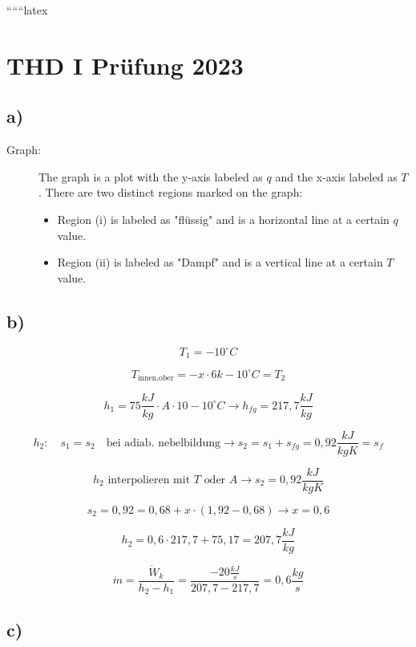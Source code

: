 
``````latex


\section*{THD I Prüfung 2023}

\subsection*{a)}

\begin{description}
    \item[Graph:] The graph is a plot with the y-axis labeled as $q$ and the x-axis labeled as $T$. There are two distinct regions marked on the graph:
    \begin{itemize}
        \item Region (i) is labeled as "flüssig" and is a horizontal line at a certain $q$ value.
        \item Region (ii) is labeled as "Dampf" and is a vertical line at a certain $T$ value.
    \end{itemize}
\end{description}

\subsection*{b)}

\[
T_1 = -10^\circ C
\]

\[
T_{\text{innen,ober}} = -x \cdot 6k - 10^\circ C = T_2
\]

\[
h_1 = 75 \frac{kJ}{kg} \cdot A \cdot 10 - 10^\circ C \rightarrow h_{fg} = 217,7 \frac{kJ}{kg}
\]

\[
h_2: \quad s_1 = s_2 \quad \text{bei adiab. nebelbildung} \rightarrow s_2 = s_1 + s_{fg} = 0,92 \frac{kJ}{kgK} = s_f
\]

\[
h_2 \text{ interpolieren mit } T \text{ oder } A \rightarrow s_2 = 0,92 \frac{kJ}{kgK}
\]

\[
s_2 = 0,92 = 0,68 + x \cdot (1,92 - 0,68) \rightarrow x = 0,6
\]

\[
h_2 = 0,6 \cdot 217,7 + 75,17 = 207,7 \frac{kJ}{kg}
\]

\[
\dot{m} = \frac{\dot{W}_k}{h_2 - h_1} = \frac{-20 \frac{kJ}{s}}{207,7 - 217,7} = 0,6 \frac{kg}{s}
\]

\subsection*{c)}

